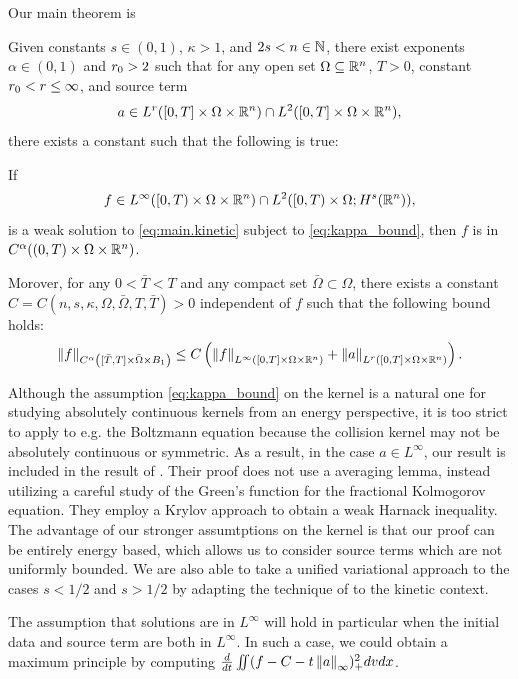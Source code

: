 Our main theorem is 
\begin{theorem} \label{thm:main}
Given constants $s \in (0,1)$, $\kappa > 1$, and $2s < n \in \mathbb{N}$, there exist exponents $\alpha \in (0,1)$ and ${r}_0 > 2$ such that for any open set $\Omega \subseteq \mathbb{R}^n$, $T > 0$, constant ${r}_0 < r \leq \infty$, and source term
\[ a \in L^{r}([0,T] \times \Omega \times \mathbb{R}^n) \cap L^2([0,T] \times \Omega \times \mathbb{R}^n), \]
there exists a constant such that the following is true:

If 
\[ f \in L^\infty([0,T)\times\Omega \times\mathbb{R}^n) \cap L^2([0,T)\times \Omega; H^s(\mathbb{R}^n)), \]
is a weak solution to \eqref{eq:main.kinetic} subject to \eqref{eq:kappa_bound}, then $f$ is in $C^\alpha((0,T)\times\Omega\times\mathbb{R}^n)$.  

\begin{sloppypar}
Morover, for any $0 < \bar{T} < T$ and any compact set $\bar{\Omega} \subset \Omega$, there exists a constant $C = C(n,s,\kappa,\Omega,\bar{\Omega},T,\bar{T}) > 0$ independent of $f$ such that the following bound holds:
\[ \left\lVert f\right\rVert_{C^\alpha\left( [\bar{T},T]\times\bar{\Omega}\times B_1 \right)} \leq C \left( \left\lVert f\right\rVert_{L^\infty\left( [0,T]\times\Omega\times \mathbb{R}^n \right)} + \left\lVert a\right\rVert_{L^{r}\left( [0,T]\times\Omega\times \mathbb{R}^n \right)} \right).  \]
\end{sloppypar}
\end{theorem}

Although the assumption \eqref{eq:kappa_bound} on the kernel is a natural one for studying absolutely continuous kernels from an energy perspective, it is too strict to apply to e.g. the Boltzmann equation because the collision kernel may not be absolutely continuous or symmetric.   As a result, in the case $a \in L^\infty$, our result is included in the result of \cite{ImSi}.  Their proof does not use a averaging lemma, instead utilizing a careful study of the Green's function for the fractional Kolmogorov equation.  They employ a Krylov approach to obtain a weak Harnack inequality. The advantage of our stronger assumtptions on the kernel is that our proof can be entirely energy based, which allows us to consider source terms which are not uniformly bounded.  We are also able to take a unified variational approach to the cases $s < 1/2$ and $s > 1/2$ by adapting the technique of \cite{CaChVa} to the kinetic context.  

The assumption that solutions are in $L^\infty$ will hold in particular when the initial data and source term are both in $L^\infty$.  In such a case, we could obtain a maximum principle by computing $\frac{d}{dt} \iint (f-C-t\left\lVert a\right\rVert_\infty)_+^2 dvdx$.  

